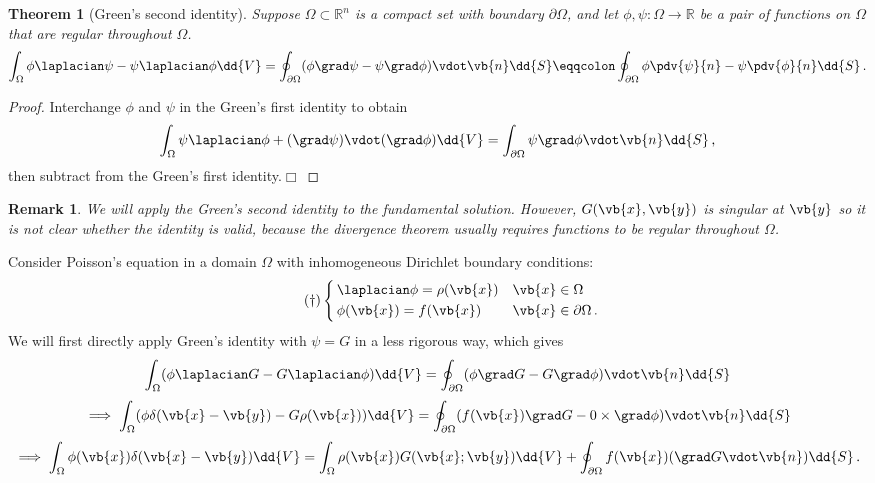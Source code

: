 \documentclass{article}
\theoremstyle{plain}\theoremheaderfont{\normalfont\itshape}\theorembodyfont{\rmfamily}\theoremseparator{.}\newtheorem*{rem}{Remark}\newtheorem*{ex}{Example}\newtheorem*{proof}{Proof}\newtheorem*{altp}{Alternative proof}
\theoremstyle{plain}\theoremheaderfont{\normalfont\bfseries}\theorembodyfont{\rmfamily}\theoremseparator{.}\newtheorem{thm}{Theorem}[section]\newtheorem{lem}[thm]{Lemma}\newtheorem{prop}[thm]{Proposition}\newtheorem*{cor}{Corollary}\newtheorem{defn}[thm]{Definition}\newtheorem{clm}[thm]{Claim}\newtheorem{clminproof}{Claim}
\theoremstyle{break}\theoremheaderfont{\normalfont\itshape}\theorembodyfont{\rmfamily}\theoremseparator{.\medskip}\newtheorem*{proofskip}{Proof}\newtheorem*{exs}{Examples}\newtheorem*{rems}{Remarks}
\theoremstyle{break}\theoremheaderfont{\normalfont\bfseries}\theorembodyfont{\rmfamily}\theoremseparator{.\medskip}\newtheorem{lemskip}[thm]{Lemma}\newtheorem{defnskip}[thm]{Definition}\newtheorem{propskip}[thm]{Proposition}\newtheorem{thmskip}[thm]{Theorem}
\numberwithin{equation}{section}
\newcommand{\qed}{\hfill\ensuremath{\Box}}
\begin{document}
	\begin{thm}[Green's second identity]		
		Suppose \(\Omega\subset\mathbb{R}^n\) is a compact set with boundary \(\partial\Omega\), and let \(\phi,\psi:\Omega\to\mathbb{R}\) be a pair of functions on \(\Omega\) that are regular throughout \(\Omega\).
		\[\int_\Omega\phi\laplacian\psi-\psi\laplacian\phi\dd{V}=\oint_{\partial\Omega}(\phi\grad\psi-\psi\grad\phi)\vdot\vb{n}\dd{S}\eqqcolon\oint_{\partial\Omega}\phi\pdv{\psi}{n}-\psi\pdv{\phi}{n}\dd{S}\,.\]
	\end{thm}
	\begin{proof} 
		Interchange \(\phi\) and \(\psi\) in the Green's first identity to obtain
		\[\int_\Omega\psi\laplacian\phi+(\grad\psi)\vdot(\grad\phi)\dd{V}=\int_{\partial\Omega}\psi\grad\phi\vdot\vb{n}\dd{S}\,,\]
		then subtract from the Green's first identity.\qed
	\end{proof}
	\begin{rem}
		We will apply the Green's second identity to the fundamental solution. However, \(G(\vb{x},\vb{y})\) is singular at \(\vb{y}\) so it is not clear whether the identity is valid, because the divergence theorem usually requires functions to be regular throughout \(\Omega\).
	\end{rem}
	
	Consider Poisson's equation in a domain \(\Omega\) with inhomogeneous Dirichlet boundary conditions:
	\begin{equation}\tag{\(\dagger\)}
		\left\{\begin{aligned}
			&\,\laplacian\phi=\rho(\vb{x}) && \vb{x}\in\Omega\\
			&\,\phi(\vb{x})=f(\vb{x}) && \vb{x}\in\partial\Omega\,.
		\end{aligned}\right.
	\end{equation}
	We will first directly apply Green's identity with \(\psi=G\) in a less rigorous way, which gives
	\[\int_\Omega(\phi\laplacian G-G\laplacian\phi)\dd{V}=\oint_{\partial\Omega}(\phi\grad G-G\grad\phi)\vdot\vb{n}\dd{S}\]
	\[\implies \int_\Omega(\phi\delta(\vb{x}-\vb{y})-G\rho(\vb{x}))\dd{V}=\oint_{\partial\Omega}(f(\vb{x})\grad G-0\times\grad\phi)\vdot\vb{n}\dd{S}\]
	\[\implies \int_\Omega\phi(\vb{x})\delta(\vb{x}-\vb{y})\dd{V}=\int_\Omega\rho(\vb{x})G(\vb{x};\vb{y})\dd{V}+\oint_{\partial\Omega}f(\vb{x})(\grad G\vdot\vb{n})\dd{S}\,.\]
\end{document}
